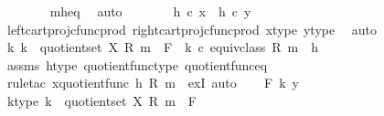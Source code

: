 \begin{isabellebody}
\ \ \ \ \ \ \isamarkupfalse%
\ m{\isacharunderscore}{\kern0pt}h{\isacharunderscore}{\kern0pt}eq\ \isamarkupfalse%
\ auto\isanewline
\ \ \ \ \isamarkupfalse%
\ \isamarkupfalse%
\ {\isachardoublequoteopen}h\ {\isasymcirc}\isactrlsub c\ x\ {\isacharequal}{\kern0pt}\ h\ {\isasymcirc}\isactrlsub c\ y{\isachardoublequoteclose}\isanewline
\ \ \ \ \ \ \isamarkupfalse%
\ left{\isacharunderscore}{\kern0pt}cart{\isacharunderscore}{\kern0pt}proj{\isacharunderscore}{\kern0pt}cfunc{\isacharunderscore}{\kern0pt}prod\ right{\isacharunderscore}{\kern0pt}cart{\isacharunderscore}{\kern0pt}proj{\isacharunderscore}{\kern0pt}cfunc{\isacharunderscore}{\kern0pt}prod\ x{\isacharunderscore}{\kern0pt}type\ y{\isacharunderscore}{\kern0pt}type\ \isamarkupfalse%
\ auto\isanewline
\ \ \isamarkupfalse%
\isanewline
\ \ \isamarkupfalse%
\ \isamarkupfalse%
\ {\isachardoublequoteopen}{\isasymexists}k{\isachardot}{\kern0pt}\ k\ {\isacharcolon}{\kern0pt}\ quotient{\isacharunderscore}{\kern0pt}set\ X\ {\isacharparenleft}{\kern0pt}R{\isacharcomma}{\kern0pt}\ m{\isacharparenright}{\kern0pt}\ {\isasymrightarrow}\ F\ {\isasymand}\ k\ {\isasymcirc}\isactrlsub c\ equiv{\isacharunderscore}{\kern0pt}class\ {\isacharparenleft}{\kern0pt}R{\isacharcomma}{\kern0pt}\ m{\isacharparenright}{\kern0pt}\ {\isacharequal}{\kern0pt}\ h{\isachardoublequoteclose}\isanewline
\ \ \ \ \isamarkupfalse%
\ assms\ h{\isacharunderscore}{\kern0pt}type\ quotient{\isacharunderscore}{\kern0pt}func{\isacharunderscore}{\kern0pt}type\ quotient{\isacharunderscore}{\kern0pt}func{\isacharunderscore}{\kern0pt}eq\isanewline
\ \ \ \ \isamarkupfalse%
\ {\isacharparenleft}{\kern0pt}rule{\isacharunderscore}{\kern0pt}tac\ x{\isacharequal}{\kern0pt}{\isachardoublequoteopen}quotient{\isacharunderscore}{\kern0pt}func\ h\ {\isacharparenleft}{\kern0pt}R{\isacharcomma}{\kern0pt}\ m{\isacharparenright}{\kern0pt}{\isachardoublequoteclose}\ \ exI{\isacharcomma}{\kern0pt}\ auto{\isacharparenright}{\kern0pt}\isanewline
{}\isamarkupfalse%
\isanewline
\ \ \isamarkupfalse%
\ F\ k\ y\isanewline
\ \ \isamarkupfalse%
\ k{\isacharunderscore}{\kern0pt}type{\isacharcolon}{\kern0pt}\ {\isachardoublequoteopen}k\ {\isacharcolon}{\kern0pt}\ quotient{\isacharunderscore}{\kern0pt}set\ X\ {\isacharparenleft}{\kern0pt}R{\isacharcomma}{\kern0pt}\ m{\isacharparenright}{\kern0pt}\ {\isasymrightarrow}\ F{\isachardoublequoteclose}\isanewline

\end{isabellebody}
